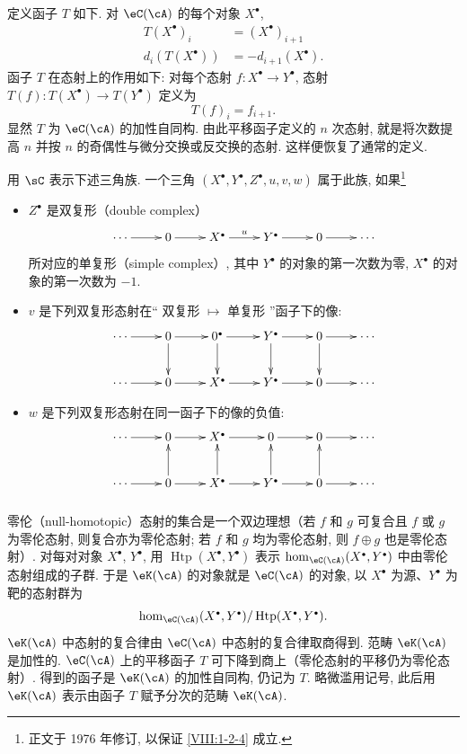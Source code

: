 定义函子 $T$ 如下. 对 $\eC(\cA)$ 的每个对象 $X^\bullet$,
\begin{align*}
  T(X^\bullet)_i &= (X^\bullet)_{i+1} \\
  d_i(T(X^\bullet)) &= -d_{i+1}(X^\bullet)  \text{.}
\end{align*}
函子 $T$ 在态射上的作用如下: 对每个态射 $f:X^\bullet \to Y^\bullet$, 态射 $T(f):T(X^\bullet) \to T(Y^\bullet)$ 定义为
\[
  T(f)_i = f_{i+1} \text{.}
\]
显然 $T$ 为 $\eC(\cA)$ 的加性自同构. 由此平移函子定义的 $n$ 次态射, 就是将次数提高 $n$ 并按 $n$ 的奇偶性与微分交换或反交换的态射. 这样便恢复了通常的定义.

用 $\sC$ 表示下述三角族. 一个三角 $(X^\bullet,Y^\bullet,Z^\bullet,u,v,w)$ 属于此族, 如果\footnote{正文于 1976 年修订, 以保证 \ref{VIII:1-2-4} 成立.}
\begin{itemize}
  \item $Z^\bullet$ 是双复形（double complex）
    \[\xymatrix{
      \cdots \ar[r]
        & 0 \ar[r]
        & X^\bullet \ar[r]^-u
        & Y^\bullet \ar[r]
        & 0 \ar[r]
        & \cdots
    }\]
    所对应的单复形（simple complex）, 其中 $Y^\bullet$ 的对象的第一次数为零, $X^\bullet$ 的对象的第一次数为 $-1$.
  \item $v$ 是下列双复形态射在“ 双复形 $\mapsto$ 单复形 ”函子下的像:
    \[\xymatrix{
      \cdots \ar[r]
        & 0 \ar[r] \ar[d]
        & 0^\bullet \ar[r] \ar[d]
        & Y^\bullet \ar[r] \ar[d]
        & 0 \ar[r] \ar[d]
        & \cdots \\
      \cdots \ar[r]
        & 0 \ar[r]
        & X^\bullet \ar[r]
        & Y^\bullet \ar[r]
        & 0 \ar[r]
        & \cdots
    }\]
  \item $w$ 是下列双复形态射在同一函子下的像的负值:
    \[\xymatrix{
      \cdots \ar[r]
        & 0 \ar[r]
        & X^\bullet \ar[r]
        & 0 \ar[r]
        & 0 \ar[r]
        & \cdots \\
      \cdots  \ar[r]
        & 0 \ar[r] \ar[u]
        & X^\bullet \ar[r] \ar[u]
        & Y^\bullet \ar[r] \ar[u]
        & 0 \ar[r] \ar[u]
        & \cdots
    }\]
\end{itemize}

\subsubsection{}\label{VIII:1-2-2}

零伦（null-homotopic）态射的集合是一个双边理想（若 $f$ 和 $g$ 可复合且 $f$ 或 $g$ 为零伦态射, 则复合亦为零伦态射; 若 $f$ 和 $g$ 均为零伦态射, 则 $f\oplus g$ 也是零伦态射）. 对每对对象 $X^\bullet$, $Y^\bullet$, 用 $\operatorname{Htp}(X^\bullet,Y^\bullet)$ 表示 $\hom_{\eC(\cA)}(X^\bullet,Y^\bullet)$ 中由零伦态射组成的子群. 于是 $\eK(\cA)$ 的对象就是 $\eC(\cA)$ 的对象, 以 $X^\bullet$ 为源、$Y^\bullet$ 为靶的态射群为
\[
  \hom_{\eC(\cA)}(X^\bullet,Y^\bullet) / \operatorname{Htp}(X^\bullet,Y^\bullet) \text{.}
\]
$\eK(\cA)$ 中态射的复合律由 $\eC(\cA)$ 中态射的复合律取商得到. 范畴 $\eK(\cA)$ 是加性的. $\eC(\cA)$ 上的平移函子 $T$ 可下降到商上（零伦态射的平移仍为零伦态射）. 得到的函子是 $\eK(\cA)$ 的加性自同构, 仍记为 $T$. 略微滥用记号, 此后用 $\eK(\cA)$ 表示由函子 $T$ 赋予分次的范畴 $\eK(\cA)$.

